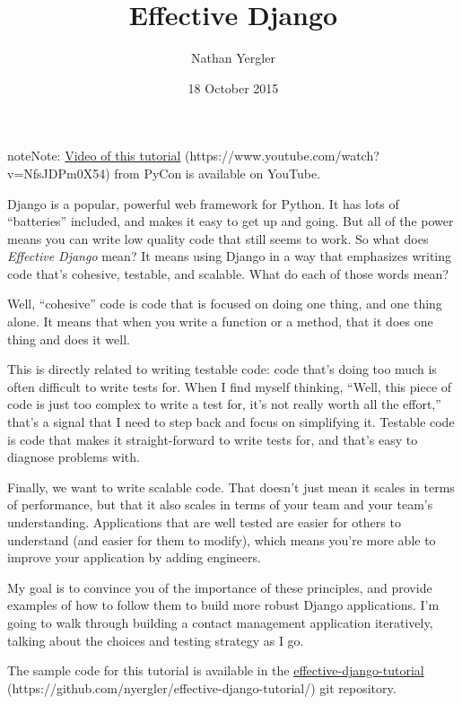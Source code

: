 \documentclass[letterpaper,10pt,english]{sphinxmanual}
\title{Effective Django}
\date{18 October 2015}
\author{Nathan Yergler}
\begin{document}
\maketitle
\tableofcontents
{}\label{tutorial/index::doc}


\begin{notice}{note}{Note:}
\href{https://www.youtube.com/watch?v=NfsJDPm0X54}{Video of this tutorial} (https://www.youtube.com/watch?v=NfsJDPm0X54) from PyCon is available on YouTube.
\end{notice}

Django is a popular, powerful web framework for Python. It has lots of
``batteries'' included, and makes it easy to get up and going. But all
of the power means you can write low quality code that still seems to
work. So what does \emph{Effective Django} mean? It means using Django in a
way that emphasizes writing code that's cohesive, testable, and
scalable. What do each of those words mean?

Well, ``cohesive'' code is code that is focused on doing one thing, and
one thing alone. It means that when you write a function or a method,
that it does one thing and does it well.

This is directly related to writing testable code: code that's doing
too much is often difficult to write tests for. When I find myself
thinking, ``Well, this piece of code is just too complex to write a
test for, it's not really worth all the effort,'' that's a signal that
I need to step back and focus on simplifying it. Testable code is code
that makes it straight-forward to write tests for, and that's easy to
diagnose problems with.

Finally, we want to write scalable code. That doesn't just mean it
scales in terms of performance, but that it also scales in terms of
your team and your team's understanding. Applications that are well
tested are easier for others to understand (and easier for them to
modify), which means you're more able to improve your application by
adding engineers.

My goal is to convince you of the importance of these principles, and
provide examples of how to follow them to build more robust Django
applications. I'm going to walk through building a contact management
application iteratively, talking about the choices and testing
strategy as I go.

The sample code for this tutorial is available in the
\href{https://github.com/nyergler/effective-django-tutorial/}{effective-django-tutorial} (https://github.com/nyergler/effective-django-tutorial/) git repository.
\end{document}
